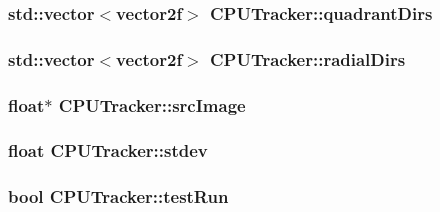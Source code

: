 \subsubsection[{\texorpdfstring{quadrant\+Dirs}{quadrantDirs}}]{\setlength{\rightskip}{0pt plus 5cm}std\+::vector$<${\bf vector2f}$>$ C\+P\+U\+Tracker\+::quadrant\+Dirs}\hypertarget{class_c_p_u_tracker_ae155aab5f1ed07d8467818b915087b20}{}\label{class_c_p_u_tracker_ae155aab5f1ed07d8467818b915087b20}
\subsubsection[{\texorpdfstring{radial\+Dirs}{radialDirs}}]{\setlength{\rightskip}{0pt plus 5cm}std\+::vector$<${\bf vector2f}$>$ C\+P\+U\+Tracker\+::radial\+Dirs}\hypertarget{class_c_p_u_tracker_a88ec0839b0866df86fb12603e553a9b9}{}\label{class_c_p_u_tracker_a88ec0839b0866df86fb12603e553a9b9}
\subsubsection[{\texorpdfstring{src\+Image}{srcImage}}]{\setlength{\rightskip}{0pt plus 5cm}float$\ast$ C\+P\+U\+Tracker\+::src\+Image}\hypertarget{class_c_p_u_tracker_a393778bc9b49eb6d5014fd814c5dfcdf}{}\label{class_c_p_u_tracker_a393778bc9b49eb6d5014fd814c5dfcdf}
\subsubsection[{\texorpdfstring{stdev}{stdev}}]{\setlength{\rightskip}{0pt plus 5cm}float C\+P\+U\+Tracker\+::stdev}\hypertarget{class_c_p_u_tracker_ae5697cf2319755515193ae21d0c8995f}{}\label{class_c_p_u_tracker_ae5697cf2319755515193ae21d0c8995f}
\subsubsection[{\texorpdfstring{test\+Run}{testRun}}]{\setlength{\rightskip}{0pt plus 5cm}bool C\+P\+U\+Tracker\+::test\+Run}\hypertarget{class_c_p_u_tracker_a5dd04ccf64ee6885b2dc272553c29644}{}\label{class_c_p_u_tracker_a5dd04ccf64ee6885b2dc272553c29644}
